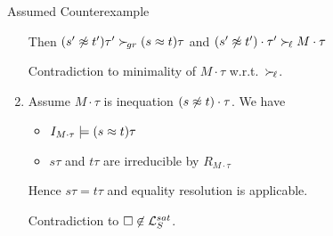 \documentclass[%
handout,
]{beamer}
\begin{document}
\begin{frame}[allowframebreaks]{Assumed Counterexample}
\begin{enumerate}
        Then $(s'\not\approx t')\tau'\mathrel\succ_{\!gr} (s\approx t)\tau$ and $(s'\not\approx t')\cdot\tau'\mathrel\succ_{\!\ell} M\cdot\tau$

        Contradiction to minimality of $M\cdot\tau$ w.r.t.~$\mathrel\succ_{\!\ell}$.
        \vspace{0.5em}

        \item Assume $M\cdot\tau$ is inequation $(s\not\approx t)\cdot\tau$. We have
        \begin{itemize}
            \item $I_{M\cdot\tau}\models (s\approx t)\tau$
            \item $s\tau$ and $t\tau$ are irreducible by $R_{M\cdot\tau}$
        \end{itemize}
        Hence $s\tau = t\tau$ and equality resolution is applicable.

        Contradiction to $\square\not\in\mathcal{L}_S^{sat}$.
    \end{enumerate}

\end{frame}
\end{document}
